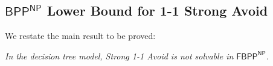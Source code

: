 \documentclass[11pt]{article}
\newtheorem*{theorem*}{Theorem}
\newtheorem{lemma}{Lemma}
\newtheorem{corollary}{Corollary}
\newcommand{\todo}[1]{\textcolor{red}{TODO: #1}}
\begin{document}






\subsection{\texorpdfstring{$\mathsf{BPP^{NP}}$}{BPP\^NP} Lower Bound for 1-1 Strong Avoid}
\label{sec:BPP-NP-lb}
We restate the main result to be proved:

\medskip
{}
{\it In the decision tree model, Strong 1-1 Avoid is not solvable in $\mathsf{FBPP^{NP}}$.}
\end{document}
